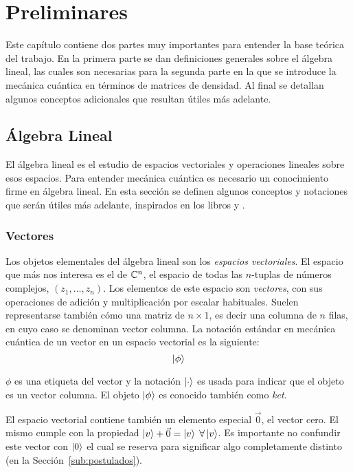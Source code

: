 \chapter{Preliminares}\label{ch:preliminares}

Este capítulo contiene dos partes muy importantes para entender la base teórica del trabajo. En la primera parte se dan definiciones generales sobre el álgebra lineal, las cuales son necesarias para la segunda parte en la que se introduce la mecánica cuántica en términos de matrices de densidad.
Al final se detallan algunos conceptos adicionales que resultan útiles más adelante.

\section{Álgebra Lineal}
El álgebra lineal es el estudio de espacios vectoriales y operaciones lineales sobre esos espacios. Para entender mecánica cuántica es necesario un conocimiento firme en álgebra lineal. En esta sección se definen algunos conceptos y notaciones que serán útiles más adelante, inspirados en los libros \cite{quantum_computer_science} y \cite{purification}.

\subsection{Vectores}

Los objetos elementales del álgebra lineal son los \emph{espacios vectoriales}. El espacio que más nos interesa es el de $\mathbb{C}^n$, el espacio de todas las $n$-tuplas de números complejos, $(z_1, \dots, z_n)$. Los elementos de este espacio son \emph{vectores}, con sus operaciones de adición y multiplicación por escalar habituales. Suelen representarse también cómo una matriz de $n \times 1$, es decir una columna de $n$ filas, en cuyo caso se denominan vector columna.
La notación estándar en mecánica cuántica de un vector en un espacio vectorial es la siguiente:
\[\ket{\phi}\]

$\phi$ es una etiqueta del vector y la notación $\ket{\cdot}$ es usada para indicar que el objeto es un vector columna. El objeto $\ket{\phi}$ es conocido también como \emph{ket}.

El espacio vectorial contiene también un elemento especial $\vec{0}$, el vector cero. El mismo cumple con la propiedad $\ket{v} + \vec{0} = \ket{v} \;\forall \ket{v}$. Es importante no confundir este vector con $\ket{0}$ el cual se reserva para significar algo completamente distinto (en la Sección~\ref{sub:postulados}).

